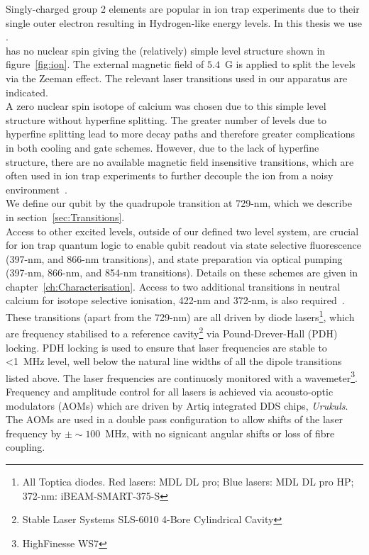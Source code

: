     Singly-charged group 2 elements are popular in ion trap
    experiments due to their single outer electron resulting in Hydrogen-like
    energy levels. In this thesis we use \ca.\\
    \ca has
    no nuclear spin giving the
    (relatively) simple level structure shown in figure~\ref{fig:ion}. The external
    magnetic field of $5.4$~G is applied to split the levels via the Zeeman
    effect. The relevant laser transitions used in our apparatus are indicated.\\
    A zero nuclear spin isotope of calcium was chosen due to this simple level
    structure without hyperfine splitting. The greater number of levels due to
    hyperfine splitting lead to more decay paths and therefore greater
    complications in both cooling and gate schemes. However, due to the lack of hyperfine structure, there are no available magnetic field insensitive transitions, which are
    often used in ion trap experiments to further decouple the ion from a noisy
    environment~\cite{}. \\
    We define our qubit by the quadrupole transition at 729-nm, which we describe in section~\ref{sec:Transitions}.\\
    Access to other excited levels, outside of our defined two level system, are crucial for ion trap quantum logic to enable qubit readout via state selective fluorescence (397-nm, and 866-nm transitions), and state preparation via optical pumping (397-nm, 866-nm, and 854-nm transitions). Details on these schemes are given in chapter~\ref{ch:Characterisation}. Access to two additional transitions in neutral calcium for isotope selective ionisation, 422-nm and 372-nm, is also required~\cite{}.\\
    These transitions (apart from the 729-nm) are all driven by diode lasers\footnote{All Toptica diodes. Red lasers: MDL DL pro; Blue lasers: MDL DL pro HP; 372-nm: iBEAM-SMART-375-S}, which are frequency stabilised to a reference cavity\footnote{Stable Laser Systems SLS-6010 4-Bore Cylindrical Cavity} via Pound-Drever-Hall (PDH) locking.  PDH locking is used to ensure that laser frequencies are stable to <1~MHz level, well below the natural line widths of all the dipole transitions listed above. The laser frequencies are continuosly monitored with a wavemeter\footnote{HighFinesse WS7}.\\
    Frequency and amplitude control for all lasers is achieved via acousto-optic modulators (AOMs) which are driven by Artiq integrated DDS chips, \emph{Urukuls}. The AOMs are used in a double pass configuration to allow shifts of the laser frequency by $\pm \sim 100$~MHz, with no signicant angular shifts or loss of fibre coupling. 
    
